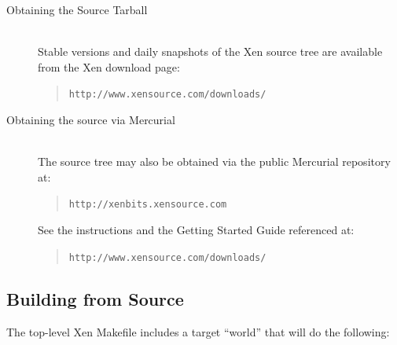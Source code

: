 \documentclass[11pt,twoside,final,openright]{report}
\begin{document}
\begin{description}
\item[Obtaining the Source Tarball]\mbox{} \\
  Stable versions and daily snapshots of the Xen source tree are
  available from the Xen download page:
  \begin{quote} {\tt \tt http://www.xensource.com/downloads/}
  \end{quote}
\item[Obtaining the source via Mercurial]\mbox{} \\
  The source tree may also be obtained via the public Mercurial
  repository at:
  \begin{quote}{\tt http://xenbits.xensource.com}
  \end{quote} See the instructions and the Getting Started Guide
  referenced at:
  \begin{quote}
    {\tt http://www.xensource.com/downloads/}
  \end{quote}
\end{description}

%
%

\subsection{Building from Source}

The top-level Xen Makefile includes a target ``world'' that will do the
following:
\end{document}
